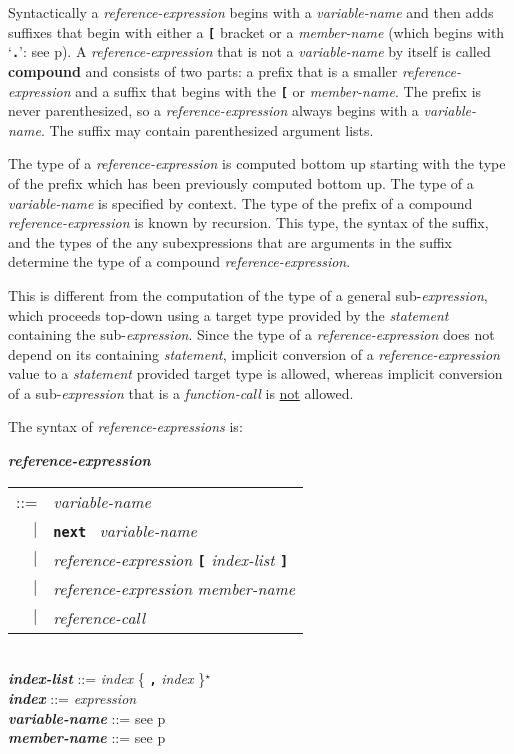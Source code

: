 \documentclass[12pt]{article}
\newcommand{\TT}[1]{{\tt \bfseries #1}}
\newcommand{\STAR}{{\Large $^\star$}}
\newcommand{\key}[1]{{\rm \bfseries #1}}
\newcommand{\emkey}[1]{{\em \bfseries #1}}
\newcommand{\pagref}[1]{p\pageref{#1}}
\newenvironment{indpar}[1][0.3in]%
	{\begin{list}{}%
		     {\setlength{\itemsep}{0in}%
		      \setlength{\topsep}{0in}%
		      \setlength{\parsep}{1ex}%
		      \setlength{\labelwidth}{#1}%
		      \setlength{\leftmargin}{#1}%
		      \addtolength{\leftmargin}{\labelsep}}%
	 \item}%
	{\end{list}}
\begin{document}
Syntactically a {\em reference-expression} begins with a {\em variable-name}
and then adds suffixes that begin with either a \TT{[} bracket
or a {\em member-name} (which begins with `\TT{.}': see \pagref{MEMBER-NAME}).
A {\em reference-expression} that is not a {\em variable-name} by
itself is called \key{compound} and consists of two parts:
a prefix that is a smaller {\em reference-expression} and a suffix that
begins with the \TT{[} or {\em member-name}.  The prefix is never
parenthesized, so a {\em reference-expression} always begins with a
{\em variable-name}.  The suffix may contain parenthesized argument
lists.

The type of a {\em reference-expression} is computed bottom up starting
with the type of the prefix which has been previously computed bottom up.
The type of a {\em variable-name} is specified by context.  The type
of the prefix of a compound {\em reference-expression} is known by
recursion.  This type, the syntax of the suffix, and the
types of the any subexpressions that are arguments in the suffix
determine the type of a compound {\em reference-expression}.

This is different from the computation of the type of a general
sub-{\em expression}, which proceeds top-down using a target type
provided by the {\em statement} containing the sub-{\em expression}.
Since the type of a {\em reference-expression} does not depend on
its containing {\em statement}, implicit conversion of a
{\em reference-expression} value to a {\em statement} provided
target type is allowed, whereas implicit conversion
of a sub-{\em expression} that is a {\em function-call}
is \underline{not} allowed.

The syntax of {\em reference-expressions} is:

\begin{indpar}
\emkey{reference-expression}\label{REFERENCE-EXPRESSION}
    \begin{tabular}[t]{rl}
    ::= & {\em variable-name} \\
    $|$ & \TT{next}~ {\em variable-name} \\
    $|$ & {\em reference-expression} \TT{[} {\em index-list} \TT{]} \\
    $|$ & {\em reference-expression} {\em member-name} \\
    $|$ & {\em reference-call} \\
    \end{tabular}
\\[0.5ex]
\emkey{index-list} ::= {\em index} \{ \TT{,} {\em index} \}\STAR{}
\\[0.5ex]
\emkey{index}\label{REFERENCE-INDEX}
    ::= {\em expression}
\\[0.5ex]
\emkey{variable-name} ::= see \pagref{VARIABLE-NAME}
\\[0.5ex]
\emkey{member-name} ::= see \pagref{MEMBER-NAME}
\end{indpar}
\end{document}
